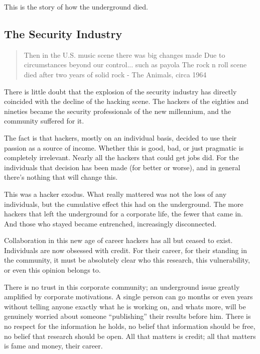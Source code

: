 \documentclass[letterpaper,12pt,english]{sphinxmanual}
\begin{document}
This is the story of how the underground died.


\subsection{The Security Industry}
\label{underground-myth:the-security-industry}\begin{quote}

Then in the U.S. music scene there was big changes made
Due to circumstances beyond our control... such as payola
The rock n roll scene died after two years of solid rock
- The Animals, circa 1964
\end{quote}

There is little doubt that the explosion of the security industry has
directly coincided with the decline of the hacking scene. The hackers
of the eighties and nineties became the security professionals of the
new millennium, and the community suffered for it.

The fact is that hackers, mostly on an individual basis, decided to
use their passion as a source of income. Whether this is good, bad,
or just pragmatic is completely irrelevant. Nearly all the hackers that
could get jobs did. For the individuals that decision has been made (for
better or worse), and in general there's nothing that will change this.

This was a hacker exodus. What really mattered was not the loss of any
individuals, but the cumulative effect this had on the underground. The
more hackers that left the underground for a corporate life, the fewer
that came in. And those who stayed became entrenched, increasingly
disconnected.

Collaboration in this new age of career hackers has all but ceased to
exist. Individuals are now obsessed with credit. For their career, for
their standing in the community, it must be absolutely clear who this
research, this vulnerability, or even this opinion belongs to.

There is no trust in this corporate community; an underground issue
greatly amplified by corporate motivations. A single person can go months
or even years without telling anyone exactly what he is working on, and
whats more, will be genuinely worried about someone ``publishing'' their
results before him. There is no respect for the information he holds,
no belief that information should be free, no belief that research should
be open. All that matters is credit; all that matters is fame and money,
their career.
\end{document}
